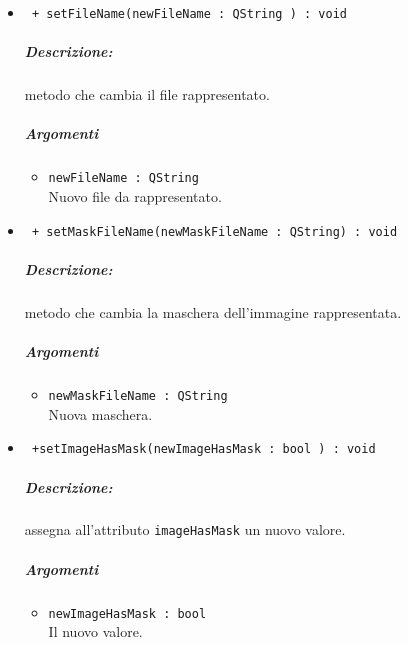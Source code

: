 \begin{itemize}
	\item \color{blue}\verb! + setFileName(newFileName : QString ) : void!\\
	\color{black}
	\subparagraph{Descrizione:} metodo che cambia il file rappresentato.
	\subparagraph{Argomenti}
		\begin{itemize}
			\item \color{RoyalPurple}\verb!newFileName : QString !\\
			\color{black}Nuovo file da rappresentato.
		\end{itemize}
		
	\item \color{blue}\verb! + setMaskFileName(newMaskFileName : QString) : void!\\
	\color{black}
	\subparagraph{Descrizione:} metodo che cambia la maschera\g{} dell'immagine rappresentata.
	\subparagraph{Argomenti}
		\begin{itemize}
			\item \color{RoyalPurple}\verb!newMaskFileName : QString!\\
			\color{black}Nuova maschera.
		\end{itemize}
	  
	 \item \color{blue}\verb! +setImageHasMask(newImageHasMask : bool ) : void!\\
	  \color{black}
	  \subparagraph{Descrizione:} assegna all'attributo \verb!imageHasMask! un nuovo valore.
	  \subparagraph{Argomenti}
	  	\begin{itemize}
		  	\item \color{RoyalPurple}\verb!newImageHasMask : bool!\\
		  	\color{black}Il nuovo valore.
	  	\end{itemize}
		
		
	\end{itemize}
\pagebreak
\color{black}
